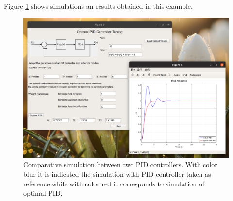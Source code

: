 Figure \ref{chpADDITOOL_fig02_ejemOptimalPID} shows simulations an results obtained in this example.
\begin{figure}[H]
	\centering
	\includegraphics[scale=0.5]{./figuras/chapter_additools/fig02EjemAdditools.png}
	\caption{Comparative simulation between two PID controllers. With color blue it is indicated the simulation with PID controller taken as reference while with color red it corresponds to simulation of optimal PID.}
	\label{chpADDITOOL_fig02_ejemOptimalPID}
\end{figure}





